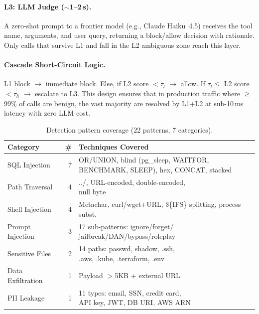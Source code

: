 \documentclass[sigconf,nonacm]{acmart}
\begin{document}
\paragraph{L3: LLM Judge ($\sim$1--2\,s).}
A zero-shot prompt to a frontier model (e.g., Claude Haiku~4.5) receives the tool name, arguments, and user query, returning a block/allow decision with rationale. Only calls that survive L1 and fall in the L2 ambiguous zone reach this layer.

\paragraph{Cascade Short-Circuit Logic.}
\label{sec:cascade}
L1 block $\to$ immediate block. Else, if L2 score $<\tau_l$ $\to$ allow. If $\tau_l \le$ L2 score $< \tau_h$ $\to$ escalate to L3. This design ensures that in production traffic where $\ge$99\% of calls are benign, the vast majority are resolved by L1+L2 at sub-10\,ms latency with zero LLM cost.

\begin{table}[t]
\centering
\footnotesize
\caption{Detection pattern coverage (22 patterns, 7 categories).}
\vspace{-0.1in}
\label{tab:patterns}
\setlength{\tabcolsep}{2.5pt}
\begin{tabular}{lrl}
\toprule
\textbf{Category} & \textbf{\#} & \textbf{Techniques Covered} \\
\midrule
SQL Injection       & 7 & \makecell[tl]{OR/UNION, blind (pg\_sleep, WAITFOR,\\BENCHMARK, SLEEP), hex, CONCAT, stacked} \\
Path Traversal      & 4 & \makecell[tl]{../, URL-encoded, double-encoded,\\null byte} \\
Shell Injection     & 4 & \makecell[tl]{Metachar, curl/wget+URL,\\\$\{IFS\} splitting, process subst.} \\
Prompt Injection    & 3 & \makecell[tl]{17 sub-patterns: ignore/forget/\\jailbreak/DAN/bypass/roleplay} \\
Sensitive Files     & 2 & \makecell[tl]{14 paths: passwd, shadow, .ssh,\\.aws, .kube, .terraform, .env} \\
Data Exfiltration   & 1 & Payload $>$5KB + external URL \\
PII Leakage         & 1 & \makecell[tl]{11 types: email, SSN, credit card,\\API key, JWT, DB URI, AWS ARN} \\
\bottomrule
\end{tabular}
\vspace{-0.15in}
\end{table}
\end{document}
